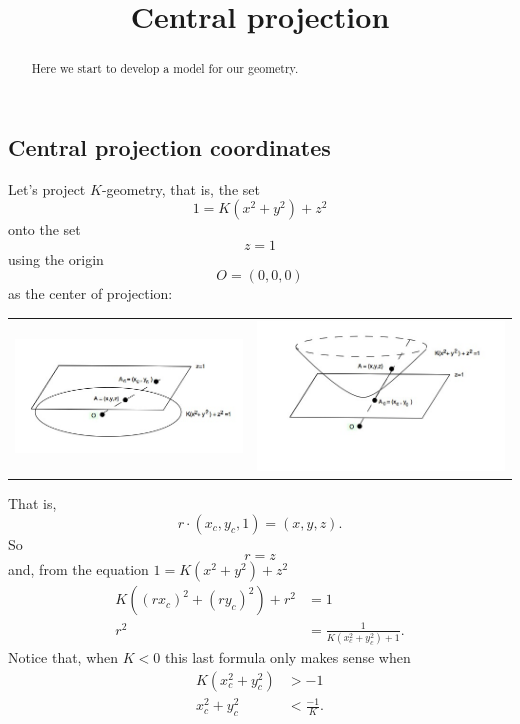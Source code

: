 \documentclass{ximera}
\title{Central projection}
\begin{document}
\begin{abstract}
Here we start to develop a model for our geometry.
\end{abstract}
\maketitle



\subsection*{Central projection coordinates}

Let's project $K$-geometry, that is, the set
\[
1=K\left(x^{2}+y^{2}\right)+z^{2} 
\]
onto the set%
\[
z=1
\]
using the origin%
\[
O=(0,0,0)
\]
as the center of projection:%

\begin{tabular}
[c]{cc}%
\includegraphics{MXAJBZ0K.jpg}%
 &
\includegraphics{MXAJBZ0L.jpg}%
\end{tabular}


That is,%
\[
r\cdot(x_{c},y_{c},1)=(x,y,z). %
\]
So%
\[
r=z
\]
and, from the equation $1=K\left(x^{2}+y^{2}\right)+z^{2}
$%
\begin{align*}
K\left( \left( rx_{c}\right) ^{2}+\left( ry_{c}\right) ^{2}\right)+r^{2} &=1\\ 
r^{2}&=\frac{1}{K\left( x_{c}^{2}+y_{c}^{2}\right) +1}.
\end{align*}
Notice that, when $K<0$ this last formula only makes sense when%
\begin{align*}
K\left(  x_{c}^{2}+y_{c}^{2}\right)  &>-1\\
x_{c}^{2}+y_{c}^{2} &<\frac{-1}{K}.
\end{align*}
\end{document}
